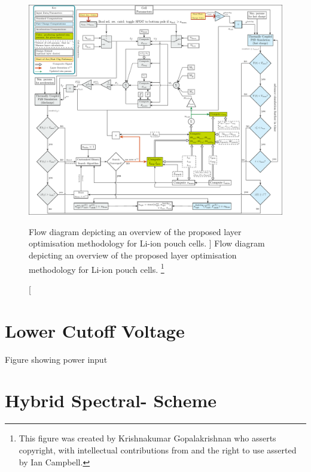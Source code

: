 \begin{figure}[p]
    \begin{minipage}[t]{\textwidth}
        \centering
        \includegraphics[angle=90, width=\textwidth]{fig_master_flow_diagram}
        \caption
        [%
        Flow diagram depicting an overview  of the proposed layer optimisation methodology
        for Li-ion pouch cells.
        ]%
        {%
            Flow diagram depicting an overview  of the proposed layer optimisation methodology
            for Li-ion pouch cells\footnotemark.
        }%
        \label{fig:fig_strategy_schematic}
        \mpfootnotes[1]
        \vspace*{0.7225cm}
        \footnote{This  figure was  created by  Krishnakumar Gopalakrishnan  who
            asserts copyright, with intellectual contributions from and the right to
        use asserted by Ian Campbell.}
    \end{minipage}
\end{figure}

\section{Lower Cutoff Voltage}\label{sec:cutoff}


Figure showing power input

\section{Hybrid Spectral- Scheme}\label{sec:hybridfv-spectral}

